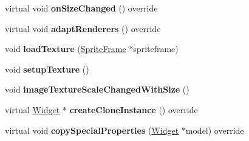 \begin{DoxyCompactItemize}
\mbox{\label{classui_1_1ImageView_a449963577ab64eda491c07675a9e12dd}} 
virtual void {\bfseries on\+Size\+Changed} () override
\item 
\mbox{\label{classui_1_1ImageView_a6c5e20c7a590870f05d3ddde09ef828e}} 
virtual void {\bfseries adapt\+Renderers} () override
\item 
\mbox{\label{classui_1_1ImageView_a55baa8a2f58014c525906e189147400e}} 
void {\bfseries load\+Texture} (\hyperlink{classSpriteFrame}{Sprite\+Frame} $\ast$spriteframe)
\item 
\mbox{\label{classui_1_1ImageView_ab7ee92cccf046d2cc0a23aaeaef3751d}} 
void {\bfseries setup\+Texture} ()
\item 
\mbox{\label{classui_1_1ImageView_a7e1258bb212cd3b565f43571951fe3cd}} 
void {\bfseries image\+Texture\+Scale\+Changed\+With\+Size} ()
\item 
\mbox{\label{classui_1_1ImageView_a86acb12074dc65eea5af40a1be53aeb2}} 
virtual \hyperlink{classui_1_1Widget}{Widget} $\ast$ {\bfseries create\+Clone\+Instance} () override
\item 
\mbox{\label{classui_1_1ImageView_a03a11ed934b12c4ae0cae6af43313700}} 
virtual void {\bfseries copy\+Special\+Properties} (\hyperlink{classui_1_1Widget}{Widget} $\ast$model) override
\end{DoxyCompactItemize}
